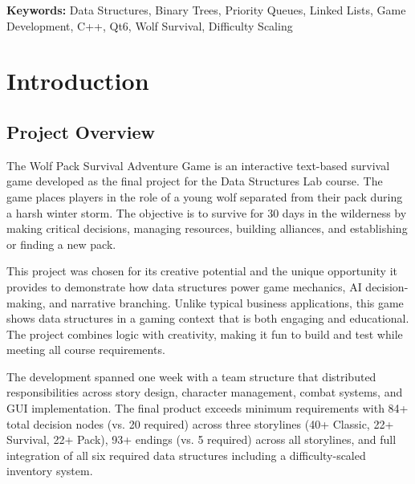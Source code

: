 \documentclass[12pt,a4paper]{article}
\begin{document}
\textbf{Keywords:} Data Structures, Binary Trees, Priority Queues, Linked Lists, Game Development, C++, Qt6, Wolf Survival, Difficulty Scaling

\newpage

\section{Introduction}

\subsection{Project Overview}
The Wolf Pack Survival Adventure Game is an interactive text-based survival game developed as the final project for the Data Structures Lab course. The game places players in the role of a young wolf separated from their pack during a harsh winter storm. The objective is to survive for 30 days in the wilderness by making critical decisions, managing resources, building alliances, and establishing or finding a new pack.

This project was chosen for its creative potential and the unique opportunity it provides to demonstrate how data structures power game mechanics, AI decision-making, and narrative branching. Unlike typical business applications, this game shows data structures in a gaming context that is both engaging and educational. The project combines logic with creativity, making it fun to build and test while meeting all course requirements.

The development spanned one week with a team structure that distributed responsibilities across story design, character management, combat systems, and GUI implementation. The final product exceeds minimum requirements with 84+ total decision nodes (vs. 20 required) across three storylines (40+ Classic, 22+ Survival, 22+ Pack), 93+ endings (vs. 5 required) across all storylines, and full integration of all six required data structures including a difficulty-scaled inventory system.
\end{document}
